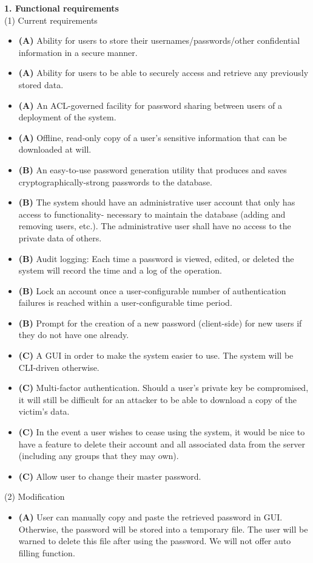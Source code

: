 \documentclass[11pt, letterpaper]{article}
\newcommand{\DesignSection}[1]
{\noindent\textbf{#1}\\}
\begin{document}
\DesignSection{1. Functional requirements}
\smallskip
\noindent(1) Current requirements
\begin{itemize} \itemsep1pt \parskip0pt 
\item \textbf{(A) }Ability for users to store their usernames/passwords/other confidential information in a secure manner.
\item \textbf{(A) }Ability for users to be able to securely access and retrieve any previously stored data.
\item \textbf{(A) }An ACL-governed facility for password sharing between users of a deployment of the system.
\item \textbf{(A) }Offline, read-only copy of a user's sensitive information that can be downloaded at will.
\item \textbf{(B) }An easy-to-use password generation utility that produces and saves cryptographically-strong passwords to the database.
\item \textbf{(B) }The system should have an administrative user account that only has access to functionality- necessary to maintain the database (adding and removing users, etc.). The administrative user shall have no access to the private data of others.
\item \textbf{(B) }Audit logging: Each time a password is viewed, edited, or deleted the system will record the time and a log of the operation.
\item \textbf{(B) }Lock an account once a user-configurable number of authentication failures is reached within a user-configurable time period.
\item \textbf{(B) }Prompt for the creation of a new password (client-side) for new users if they do not have one already.
\item \textbf{(C) }A GUI in order to make the system easier to use. The system will be CLI-driven otherwise.
\item \textbf{(C) }Multi-factor authentication. Should a user's private key be compromised, it will still be difficult for an attacker to be able to download a copy of the victim's data.
\item \textbf{(C) }In the event a user wishes to cease using the system, it would be nice to have a feature to delete their account and all associated data from the server (including any groups that they may own).
\item \textbf{(C) }Allow user to change their master password.
\end{itemize}
\smallskip
\noindent(2) Modification
\begin{itemize} \itemsep1pt \parskip0pt 
\item \textbf{(A) }User can manually copy and paste the retrieved password in GUI. Otherwise, the password will be stored into a temporary file. The user will be warned to delete this file after using the password. We will not offer auto filling function.
\end{itemize}
\end{document}
